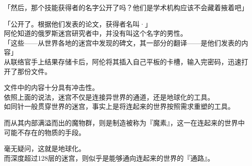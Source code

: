 「然后，那个技能获得者的名字公开了吗？他们是学术机构应该不会藏着掖着吧」

「公开了。根据他们发表的论文，获得者名叫·」\\

阿伦知道的俄罗斯迷宫研究者中，并没有叫这个名字的男性。\\

「这些——从世界各地的迷宫中发现的碑文，其一部分的翻译——是他们发表的内容」\\

从联络官手上结果存储卡后，阿伦将其插入自己平板的卡槽，输入完密码，迅速打开了那份文件。

文件中的内容十分具有冲击性。\\

依照上面的说法，迷宫不仅是连接异世界的通道，还是地球化的工具。\\

如同针一般贯穿世界的迷宫，事实上是将连起来的世界按照需求重塑的工具。

而从其内部满溢而出的魔物群，则是制造被称为『魔素』，这一在连起来的世界中可能不存在的物质的手段。

毫无疑问，这就是地球化。\\

而深度超过128层的迷宫，则似乎是能够通向连起来的世界的『通路』。\\

